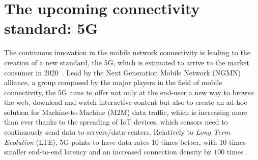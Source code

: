\section{The upcoming connectivity standard: 5G}
The continuous innovation in the mobile network connectivity is leading to the
creation of a new standard, the 5G, which is estimated to arrive to the market
consumer in 2020~\cite{iwamura2015ngmn}. Lead by the Next Generation Mobile
Network (NGMN) alliance, a group composed by the major players in the field of
mobile connectivity, the 5G aims to offer not only at the end-user a new way to
browse the web, download and watch interactive content but also to create an
ad-hoc solution for Machine-to-Machine (M2M) data traffic, which is increasing
more than ever thanks to the spreading of IoT devices, which sensors need to 
continuously send data to servers/data-centers. Relatively to \emph{Long Term
Evolution} (LTE), 5G points to have data rates $10$ times better, with $10$
times smaller end-to-end latency and an increased connection density by $100$ 
times~\cite{alliance20155g}.

